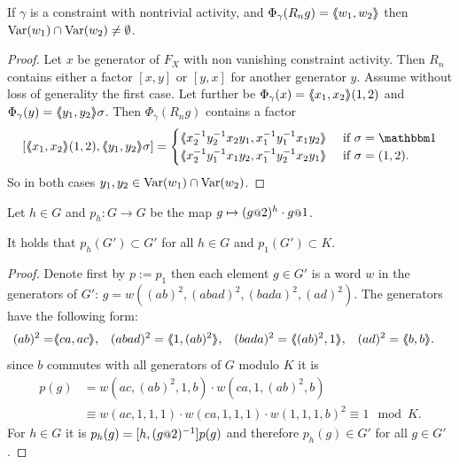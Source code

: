 \documentclass[a4paper,11pt]{amsart}
\begin{document}
\begin{lem} \label{lem:commonVar}
 If $\gamma$ is a constraint with nontrivial activity, and $\Phi_\gamma(R_ng)=\langle\negthickspace\langle w_1,w_2\rangle\negthickspace\rangle$ then $\textup{Var}(w_1)\cap\textup{Var}(w_2)\neq \emptyset$.
\end{lem}
\begin{proof}
 Let $x$ be generator of $F_X$ with non vanishing constraint activity. 
 Then $R_n$ contains either a factor $[x,y]$ or $[y,x]$ for another generator $y$. Assume without loss of generality the first case.
 Let further be $\Phi_\gamma(x)=\langle\negthickspace\langle x_1,x_2\rangle\negthickspace\rangle(1,2)$ and $\Phi_\gamma(y)=\langle\negthickspace\langle y_1,y_2\rangle\negthickspace\rangle\sigma$. 
 Then $\Phi_\gamma(R_n g)$ contains a factor 
 \[ [\pair{x_1,x_2}(1,2),\pair{y_1,y_2}\sigma] = \begin{cases}
                                                   \pair{x_2^{-1}y_2^{-1}x_2y_1,x_1^{-1}y_1^{-1}x_1y_2} & \textup{ if } \sigma=\id \\
                                                   \pair{x_2^{-1}y_1^{-1}x_1y_2,x_1^{-1}y_2^{-1}x_2y_1} & \textup{ if } \sigma=(1,2) . \\
                                                 \end{cases}
\] So in both cases $y_1,y_2\in \textup{Var}(w_1)\cap \textup{Var}(w_2)$. 
\end{proof}
\begin{lem} \label{lem:productOfStatesIsInDerived} 
 Let $h\in G$ and $p_h\colon G\to G$ be the map $g\mapsto (g\at{2})^{h}\cdot g\at{1}$.
 
 It holds that $p_h(G')\subset G'$ for all $h\in G$ and $p_1(G')\subset K$. 
\end{lem}
\begin{proof}
 Denote first by $p:=p_1$ then  each element $g\in G'$ is a word $w$ in the generators of $G'$:
 $g=w((ab)^2,(abad)^2,(bada)^2,(ad)^2)$. 
 The generators have the following form:
 \begin{align*}
 (ab)^2=&\pair{ca,ac},& (abad)^2 &= \pair{1,(ab)^2},& (bada)^2&=\pair{(ab)^2,1},& (ad)^2&=\pair{b,b}.
 \end{align*}
 since $b$ commutes with all generators of $G$ modulo $K$ it is
 \begin{align*}
  p(g) &= w(ac,(ab)^2,1,b) \cdot w(ca,1,(ab)^2,b)\\ &\equiv w(ac,1,1,1) \cdot w(ca,1,1,1) \cdot w(1,1,1,b)^2 \equiv 1 \mod K.
 \end{align*}
 For $h\in G$ it is $p_h(g)=[h,(g\at{2})^{-1}]p(g)$ and therefore $p_h(g)\in G'$ for all $g\in G'$.
\end{proof}
\end{document}
